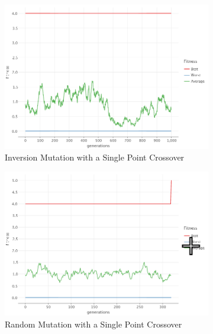     \begin{figure}[ht!]
        \centering
        \begin{subfigure}{0.45\textwidth}
            \includegraphics[width=\textwidth]{img/beacon_sp_inv_1.png}
            \caption{Inversion Mutation with a Single Point Crossover}
            \label{fig:beacon:1:inversion}
        \end{subfigure}
        \begin{subfigure}{0.45\textwidth}
            \includegraphics[width=\textwidth]{img/beacon_sp_random_1.png}
            \caption{Random Mutation with a Single Point Crossover}
            \label{fig:beacon:1:random}
        \end{subfigure}
        \begin{subfigure}{0.45\textwidth}

\end{subfigure}
\end{figure}
